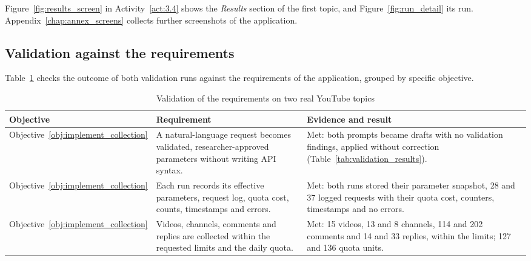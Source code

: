 Figure~\ref{fig:results_screen} in Activity~\ref{act:3.4} shows the \emph{Results} section of the first topic, and Figure~\ref{fig:run_detail} its run. Appendix~\ref{chap:annex_screens} collects further screenshots of the application.

\subsection{Validation against the requirements}

Table~\ref{tab:validation_requirements} checks the outcome of both validation runs against the requirements of the application, grouped by specific objective.

\begingroup
{}
\begin{table}[htbp]
    \centering
    \footnotesize
    \caption{Validation of the requirements on two real YouTube topics}
    \label{tab:validation_requirements}
    \begin{tabularx}
        {\textwidth}{>{\raggedright\arraybackslash}p{1.8cm}>{\raggedright\arraybackslash}p{6.2cm}X}
        \toprule
        \textbf{Objective}                                                  & \textbf{Requirement}                                                                                                        & \textbf{Evidence and result}                                                                                                         \\
        \midrule
        Objective~\ref{obj:implement_collection}                            & A natural-language request becomes validated, researcher-approved parameters without writing API syntax.                    & Met: both prompts became drafts with no validation findings, applied without correction (Table~\ref{tab:validation_results}).
        \\
        \midrule
        Objective~\ref{obj:implement_collection}                            & Each run records its effective parameters, request log, quota cost, counts, timestamps and errors.                          & Met: both runs stored their parameter snapshot, 28 and 37 logged requests with their quota cost, counters, timestamps and no errors.
        \\
        \midrule
        Objective~\ref{obj:implement_collection}                            & Videos, channels, comments and replies are collected within the requested limits and the daily quota.                       & Met: 15 videos, 13 and 8 channels, 114 and 202 comments and 14 and 33 replies, within the limits; 127 and 136 quota units.

\end{tabularx}
\end{table}
